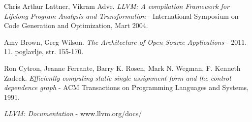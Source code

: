\begin{thebibliography}{9}
	Chris Arthur Lattner, Vikram Adve.
	\emph{LLVM: A compilation Framework for Lifelong Program Analysis and Transformation}
	- International Symposium on Code Generation and Optimization, Mart 2004.
	
	Amy Brown, Greg Wilson.
	\emph{The Architecture of Open Source Applications}
	- 2011. 11. poglavlje, str. 155-170. 

	Ron Cytron, Jeanne Ferrante, Barry K. Rosen, Mark N. Wegman, F. Kenneth Zadeck.
	\emph{Efficiently computing static single assignment form and the control dependence graph}
	- ACM Transactions on Programming Languages and Systems, 1991. 


	\emph{LLVM: Documentation}
	- www.llvm.org/docs/

\end{thebibliography}